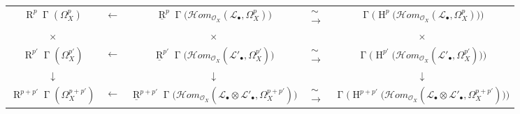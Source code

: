 \begin{cproof}
  \begin{table}[!ht]
    \centering
    \tabcolsep=0mm
    \renewcommand\arraystretch{1.2}
    \begin{tabular}{ccccc}
      \small$\operatorname{R}^p\operatorname{\Gamma}(\Omega_X^p)$           & $\leftarrow$ & \small$\underline{\operatorname{R}}^p\operatorname{\Gamma}\big(\mathcal{H}om_{\mathcal{O}_X}(\mathcal{L}_\bullet,\Omega_X^p)\big)$                                      & $\substack{\sim\\\rightarrow}$ & \small$\operatorname{\Gamma}\big(\operatorname{H}^p\big(\mathcal{H}om_{\mathcal{O}_X}(\mathcal{L}_\bullet,\Omega_X^p)\big)\big)$                                      \\
      $\times$                                               &              & $\times$                                                                                                                                                 &               & $\times$                                                                                                                                               \\
      \small$\operatorname{R}^{p'}\operatorname{\Gamma}(\Omega_X^{p'})$     & $\leftarrow$ & \small$\underline{\operatorname{R}}^{p'}\operatorname{\Gamma}\big(\mathcal{H}om_{\mathcal{O}_X}(\mathcal{L}'_\bullet,\Omega_X^{p'})\big)$                               & $\substack{\sim\\\rightarrow}$ & \small$\operatorname{\Gamma}\big(\operatorname{H}^{p'}\big(\mathcal{H}om_{\mathcal{O}_X}(\mathcal{L}'_\bullet,\Omega_X^{p'})\big)\big)$                              \\
      $\downarrow$                                           &              & $\downarrow$                                                                                                                                             &               & $\downarrow$                                                                                                                                           \\
      \small$\operatorname{R}^{p+p'}\operatorname{\Gamma}(\Omega_X^{p+p'})$ & $\leftarrow$ & \small$\underline{\operatorname{R}}^{p+p'}\operatorname{\Gamma}\big(\mathcal{H}om_{\mathcal{O}_X}(\mathcal{L}_\bullet\otimes\mathcal{L}'_\bullet,\Omega_X^{p+p'})\big)$ & $\substack{\sim\\\rightarrow}$ & \small$\operatorname{\Gamma}\big(\operatorname{H}^{p+p'}\big(\mathcal{H}om_{\mathcal{O}_X}(\mathcal{L}_\bullet\otimes\mathcal{L}'_\bullet,\Omega_X^{p+p'})\big)\big)$
    \end{tabular}
  \end{table}
  \begin{equation}\tag{4.5}\label{fga1-equation-4.5}
    ~
  \end{equation}


\end{cproof}
